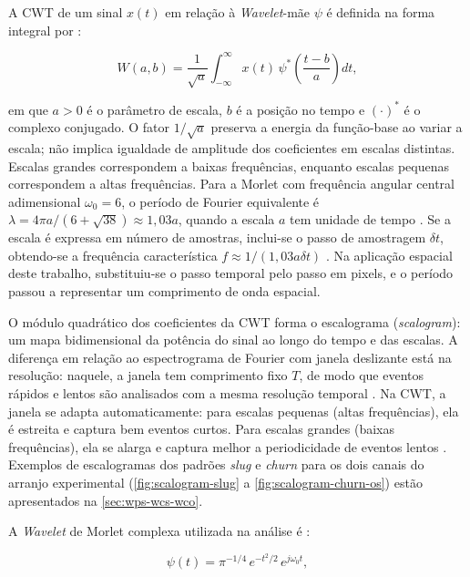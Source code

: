 A CWT de um sinal $x(t)$ em relação à \textit{Wavelet}-mãe $\psi$ é definida
na forma integral por \cite{schuck2019}:

\begin{equation}\label{eq:cwt}
  W(a, b) = \frac{1}{\sqrt{a}} \int_{-\infty}^{\infty} x(t)\,
  \psi^*\!\left(\frac{t - b}{a}\right) dt,
\end{equation}

\noindent
em que $a > 0$ é o parâmetro de escala, $b$ é a posição no tempo e $(\cdot)^*$ é o
complexo conjugado. O fator $1/\sqrt{a}$ preserva a energia da função-base ao
variar a escala; não implica igualdade de amplitude dos coeficientes em escalas
distintas. Escalas grandes correspondem a baixas frequências, enquanto escalas
pequenas correspondem a altas frequências. Para a Morlet com frequência angular
central adimensional $\omega_0=6$, o período de Fourier equivalente é
$\lambda=4\pi a/(6+\sqrt{38})\approx1{,}03a$, quando a escala $a$ tem unidade de
tempo \cite{torrence1998,grinsted2004}. Se a escala é expressa em número de
amostras, inclui-se o passo de amostragem $\delta t$, obtendo-se a frequência
característica $f\approx1/(1{,}03a\delta t)$ \cite{torrence1998,grinsted2004}.
Na aplicação espacial deste trabalho, substituiu-se o passo temporal pelo passo
em pixels, e o período passou a representar um comprimento de onda espacial.

O módulo quadrático dos coeficientes da CWT forma o escalograma (\textit{scalogram}):
um mapa bidimensional da potência do sinal ao longo do tempo e das escalas.
A diferença em relação
ao espectrograma de Fourier com janela deslizante está na resolução: naquele, a janela
tem comprimento fixo $T$, de modo que eventos rápidos e lentos são analisados com a mesma
resolução temporal \cite{torrence1998}. Na CWT, a janela se adapta automaticamente: para
escalas pequenas (altas frequências), ela é estreita e captura bem eventos curtos. Para
escalas grandes (baixas frequências), ela se alarga e captura melhor a periodicidade de
eventos lentos \cite{torrence1998}. Exemplos de escalogramas dos padrões
\textit{slug} e \textit{churn} para os
dois canais do arranjo experimental (\autoref{fig:scalogram-slug} a
\autoref{fig:scalogram-churn-os}) estão apresentados na \autoref{sec:wps-wcs-wco}.

A \textit{Wavelet} de Morlet complexa utilizada na análise é
\cite{torrence1998,schuck2019}:

\begin{equation}\label{eq:morlet}
  \psi(t) = \pi^{-1/4}\, e^{-t^2/2}\, e^{j\omega_0 t},
\end{equation}

